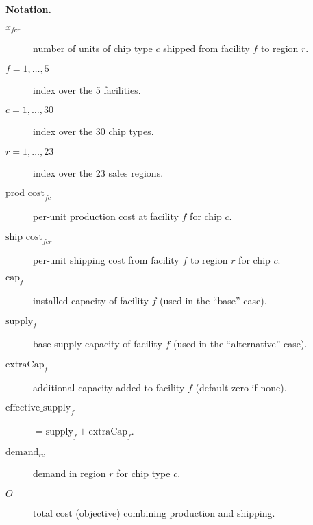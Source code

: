 \documentclass{article}
\begin{document}
\noindent\textbf{Notation.}
\begin{description}
  \item[$x_{f c r}$] number of units of chip type $c$ shipped from facility $f$ to region $r$.
  \item[$f = 1,\dots,5$] index over the 5 facilities.
  \item[$c = 1,\dots,30$] index over the 30 chip types.
  \item[$r = 1,\dots,23$] index over the 23 sales regions.
  \item[$\mathrm{prod\_cost}_{f c}$] per‐unit production cost at facility $f$ for chip $c$.
  \item[$\mathrm{ship\_cost}_{f c r}$] per‐unit shipping cost from facility $f$ to region $r$ for chip $c$.
  \item[$\mathrm{cap}_{f}$] installed capacity of facility $f$ (used in the “base” case).
  \item[$\mathrm{supply}_{f}$] base supply capacity of facility $f$ (used in the “alternative” case).
  \item[$\mathrm{extraCap}_{f}$] additional capacity added to facility $f$ (default zero if none).
  \item[$\mathrm{effective\_supply}_{f}$] $=\mathrm{supply}_{f} + \mathrm{extraCap}_{f}$.
  \item[$\mathrm{demand}_{r c}$] demand in region $r$ for chip type $c$.
  \item[$O$] total cost (objective) combining production and shipping.
\end{description}
\end{document}

